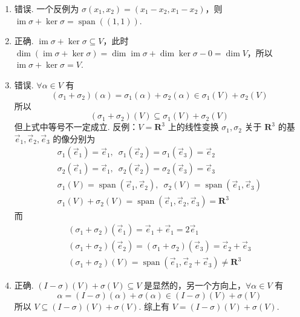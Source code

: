 \documentclass[12pt,fontset=fandol]{ctexart}
\begin{document}
\begin{solve}
\begin{enumerate}
                \item 错误. 一个反例为 $ \sigma(x_1, x_2) = (x_1 - x_2, x_1 - x_2) $，则 $ \operatorname{im} \sigma + \ker \sigma = \operatorname{span}((1, 1)) $.

                \item 正确. $ \operatorname{im} \sigma + \ker \sigma \subseteq V $，此时 $ \dim(\operatorname{im} \sigma + \ker \sigma) = \dim \operatorname{im} \sigma + \dim \ker \sigma - 0 = \dim V $，所以 $ \operatorname{im} \sigma + \ker \sigma = V $.

                \item \label{item:6:B:2:3}
                      错误. $ \forall \alpha \in V $ 有
                      \[ (\sigma_1 + \sigma_2)(\alpha) = \sigma_1(\alpha) + \sigma_2(\alpha) \in \sigma_1(V) + \sigma_2(V) \]
                      所以
                      \[ (\sigma_1 + \sigma_2)(V) \subseteq \sigma_1(V) + \sigma_2(V) \]
                      但上式中等号不一定成立. 反例：$ V = \mathbf{R}^3 $ 上的线性变换 $ \sigma_1, \sigma_2 $ 关于 $ \mathbf{R}^3 $ 的基 $ \vec{e}_1, \vec{e}_2, \vec{e}_3 $ 的像分别为
                      \begin{gather*}
                          \sigma_1(\vec{e}_1) = \vec{e}_1,\enspace \sigma_1(\vec{e}_2) = \sigma_1(\vec{e}_3) = \vec{e}_2 \\
                          \sigma_2(\vec{e}_1) = \vec{e}_1,\enspace \sigma_2(\vec{e}_2) = \sigma_2(\vec{e}_3) = \vec{e}_3 \\
                          \sigma_1(V) = \operatorname{span}(\vec{e}_1, \vec{e}_2),\enspace \sigma_2(V) = \operatorname{span}(\vec{e}_1, \vec{e}_3) \\
                          \sigma_1(V) + \sigma_2(V) = \operatorname{span}(\vec{e}_1, \vec{e}_2, \vec{e}_3) = \mathbf{R}^3
                      \end{gather*}
                      而
                      \begin{gather*}
                          (\sigma_1 + \sigma_2)(\vec{e}_1) = \vec{e}_1 + \vec{e}_1 = 2 \vec{e}_1 \\
                          (\sigma_1 + \sigma_2)(\vec{e}_2) = (\sigma_1 + \sigma_2)(\vec{e}_3) = \vec{e}_2 + \vec{e}_3 \\
                          (\sigma_1 + \sigma_2)(V) = \operatorname{span}(\vec{e}_1, \vec{e}_2 + \vec{e}_3) \neq \mathbf{R}^3
                      \end{gather*}

                \item 正确. $(I - \sigma)(V) + \sigma(V) \subseteq V$ 是显然的，另一个方向上，$ \forall \alpha \in V $ 有
                      \[ \alpha = (I - \sigma)(\alpha) + \sigma(\alpha) \in (I - \sigma)(V) + \sigma(V) \]
                      所以 $ V \subseteq (I - \sigma)(V) + \sigma(V) $. 综上有 $ V = (I - \sigma)(V) + \sigma(V) $.
            \end{enumerate}
\end{solve}
\end{document}
